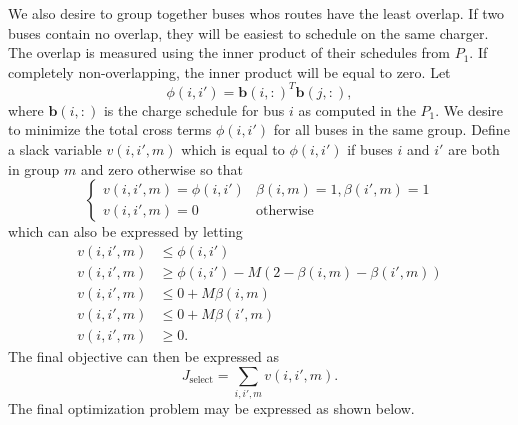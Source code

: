 \par We also desire to group together buses whos routes have the least overlap. If two buses contain no overlap, they will be easiest to schedule on the same charger.  The overlap is measured using the inner product of their schedules from $P_1$.  If completely non-overlapping, the inner product will be equal to zero. Let
\begin{equation*}
\phi(i,i') = \mathbf{b}(i,:)^T\mathbf{b}(j,:),
\end{equation*}
where $\mathbf{b}(i,:)$ is the charge schedule for bus $i$ as computed in the $P_1$. We desire to minimize the total cross terms $\phi(i,i')$ for all buses in the same group.  Define a slack variable $v(i,i',m)$ which is equal to $\phi(i,i')$ if buses $i$ and $i'$ are both in group $m$ and zero otherwise so that
\begin{equation*}
	\begin{cases}
		v(i,i',m) = \phi(i,i') & \beta(i,m) = 1, \beta(i',m) = 1 \\
		v(i,i',m) = 0 & \text{otherwise}
	\end{cases}
\end{equation*}
which can also be expressed by letting
\begin{equation}\label{eqn:groups:innerProd}\begin{aligned}
	v(i,i',m) &\le \phi(i,i') \\
	v(i,i',m) &\ge \phi(i,i') - M\left (2 - \beta(i,m) - \beta(i',m)\right ) \\
	v(i,i',m) &\le 0 + M\beta(i,m) \\
	v(i,i',m) &\le 0 + M\beta(i',m) \\
	v(i,i',m) &\ge 0.
\end{aligned}\end{equation}
The final objective can then be expressed as
\begin{equation}\label{eqn:groups:objective}
	J_{\text{select}} = \sum_{i,i',m} v(i,i',m).
\end{equation}
The final optimization problem may be expressed as shown below. \\[0.1in]

